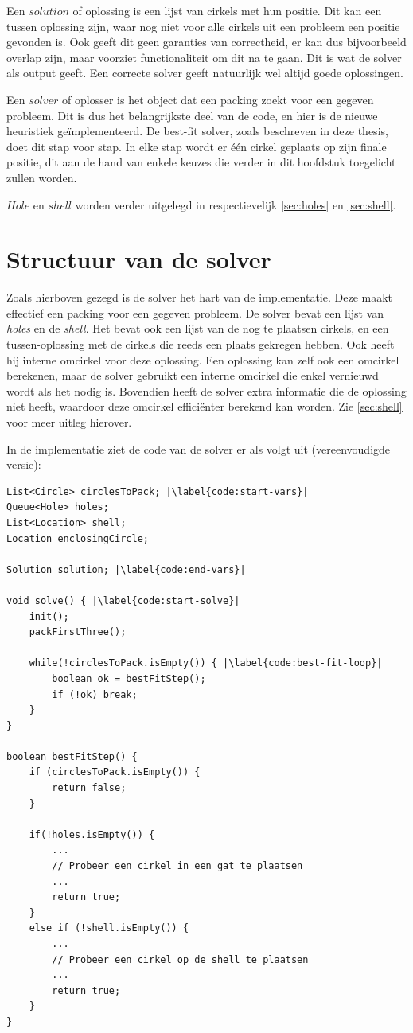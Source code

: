 \documentclass[12pt,a4paper,oneside]{book}
\begin{document}
Een $solution$ of oplossing is een lijst van cirkels met hun positie.
Dit kan een tussen oplossing zijn, waar nog niet voor alle cirkels uit een probleem een positie gevonden is.
Ook geeft dit geen garanties van correctheid, er kan dus bijvoorbeeld overlap zijn, maar voorziet functionaliteit om dit na te gaan.
Dit is wat de solver als output geeft.
Een correcte solver geeft natuurlijk wel altijd goede oplossingen.

Een $solver$ of oplosser is het object dat een packing zoekt voor een gegeven probleem.
Dit is dus het belangrijkste deel van de code, en hier is de nieuwe heuristiek geïmplementeerd.
De best-fit solver, zoals beschreven in deze thesis, doet dit stap voor stap.
In elke stap wordt er één cirkel geplaats op zijn finale positie, dit aan de hand van enkele keuzes die verder in dit hoofdstuk toegelicht zullen worden.

$Hole$ en $shell$ worden verder uitgelegd in respectievelijk \autoref{sec:holes} en \autoref{sec:shell}.

\section{Structuur van de solver}

Zoals hierboven gezegd is de solver het hart van de implementatie.
Deze maakt effectief een packing voor een gegeven probleem.
De solver bevat een lijst van \textit{holes} en de \textit{shell}.
Het bevat ook een lijst van de nog te plaatsen cirkels, en een tussen-oplossing met de cirkels die reeds een plaats gekregen hebben.
Ook heeft hij interne omcirkel voor deze oplossing.
Een oplossing kan zelf ook een omcirkel berekenen, maar de solver gebruikt een interne omcirkel die enkel vernieuwd wordt als het nodig is.
Bovendien heeft de solver extra informatie die de oplossing niet heeft, waardoor deze omcirkel efficiënter berekend kan worden.
Zie \autoref{sec:shell} voor meer uitleg hierover.

In de implementatie ziet de code van de solver er als volgt uit (vereenvoudigde versie):

\begin{lstlisting}
List<Circle> circlesToPack; |\label{code:start-vars}|
Queue<Hole> holes;
List<Location> shell;
Location enclosingCircle;

Solution solution; |\label{code:end-vars}|

void solve() { |\label{code:start-solve}|
	init();
	packFirstThree();
	
	while(!circlesToPack.isEmpty()) { |\label{code:best-fit-loop}|
		boolean ok = bestFitStep();
		if (!ok) break;
	}
}

boolean bestFitStep() {
	if (circlesToPack.isEmpty()) {
		return false;
	}
	
	if(!holes.isEmpty()) {
		...
		// Probeer een cirkel in een gat te plaatsen
		...
		return true;
	}
	else if (!shell.isEmpty()) {
		...
		// Probeer een cirkel op de shell te plaatsen
		...
		return true;
	}
}
\end{lstlisting}
\end{document}
